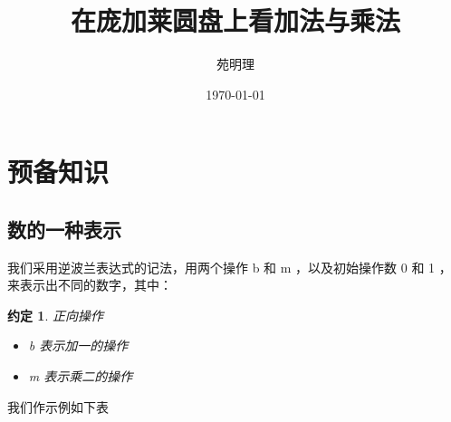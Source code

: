\documentclass[a4paper,12pt]{article}
\title{在庞加莱圆盘上看加法与乘法}
\author{苑明理}
\date{\monthyeardate\today}
\newtheorem{convention}{约定}
\begin{document}
\maketitle{}

\renewcommand\contentsname{目录}
\setcounter{tocdepth}{2}
\tableofcontents

\newpage

\section{预备知识}

\subsection{数的一种表示}

我们采用逆波兰表达式的记法，用两个操作 b 和 m ，以及初始操作数 0 和 1 ，来表示出不同的数字，其中：

\begin{convention}
正向操作
\begin{itemize}
\item b 表示加一的操作
\item m 表示乘二的操作
\end{itemize}
\end{convention}

我们作示例如下表
\end{document}
